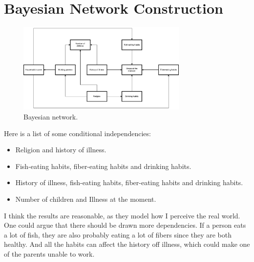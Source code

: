 \documentclass[a4paper]{article}
\begin{document}
    \section{Bayesian Network Construction}
        \begin{figure}[h]
            \centering
            \includegraphics[width=0.75\textwidth]{bayesian_network.pdf}
            \caption{Bayesian network.}
        \end{figure}
        Here is a list of some conditional independencies:
        \begin{itemize}
            \item Religion and history of illness.
            \item Fish-eating habits, fiber-eating habits and drinking habits.
            \item History of illness, fish-eating habits, fiber-eating habits and drinking habits.
            \item Number of children and Illness at the moment.
        \end{itemize}
        I think the results are reasonable, as they model how I perceive the real world. One could argue that there should be drawn more dependencies. If a person eats a lot of fish, they are also probably eating a lot of fibers since they are both healthy. And all the habits can affect the history off illness, which could make one of the parents unable to work. 
\end{document}
